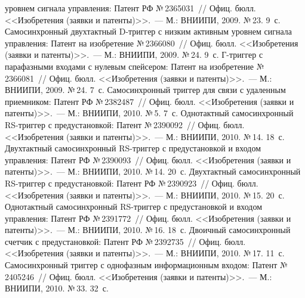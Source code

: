 \begin{multicols}{2}
{{\begin{thebibliography}{99}
уровнем сигнала управ\-ле\-ния: Патент РФ №\,2365031~// Офиц. бюлл. <<Изобретения 
(заявки и патенты)>>.~--- М.: ВНИИПИ, 2009. №\,23. 9~с.
 Самосинхронный двухтактный D-триг\-гер с низким активным 
уровнем сигнала управления: Патент на изобретение №\,2366080~// Офиц. бюлл. 
<<Изобретения (заявки и патенты)>>.~--- М.: ВНИИПИ,  2009. №\,24. 9~с.
\linebreak Г-триг\-гер с парафазными 
входами с нулевым спейсером: Патент на изобретение №\,2366081~// Офиц. бюлл. 
<<Изобретения (заявки и патенты)>>.~--- М.: ВНИИПИ, 2009. №\,24. 7~с.
 Самосинхронный триггер для связи с удаленным приемником: 
Патент РФ №\,2382487~// Офиц. бюлл. <<Изобретения (заявки и патенты)>>.~--- М.: 
ВНИИПИ, 2010. №\,5. 7~с.
Однотактный самосинхронный RS-триг\-гер с предустановкой: Патент №\,2390092~// 
Офиц. бюлл. <<Изобретения (заявки и патенты)>>.~--- М.: ВНИИПИ, 2010. №\,14. 18~с.
 Двухтактный 
самосинхронный RS-триг\-гер с предустановкой и входом управления: Патент РФ 
№\,2390093~// Офиц. бюлл. <<Изобретения (заявки и патенты)>>.~--- М.: ВНИИПИ, 
2010. №\,14. 20~с.
Двухтактный самосинхронный RS-триг\-гер с предустановкой: Патент РФ №\,2390923~// 
Офиц. бюлл. <<Изобретения (заявки и патенты)>>.~--- М.: ВНИИПИ, 2010. №\,15. 20~с.
 Однотактный 
самосинхронный RS-триг\-гер с предустановкой и входом управления: Патент РФ 
№\,2391772~// Офиц. бюлл. <<Изобретения (заявки и патенты)>>.~--- М.: ВНИИПИ, 
2010. №\,16. 18~с.
 Двоичный самосинхронный 
счетчик с предустановкой: Патент РФ №\,2392735~// Офиц. бюлл. <<Изобретения (заявки 
и патенты)>>.~--- М.: ВНИИПИ, 2010. №\,17. 11~с.
 Самосинхронный триггер с 
однофазным информационным входом: Патент №\,2405246~// Офиц. бюлл. 
<<Изобретения (заявки и патенты)>>.~--- М.: ВНИИПИ, 2010. №\,33. 32~с.




\end{thebibliography}}}
\end{multicols}
